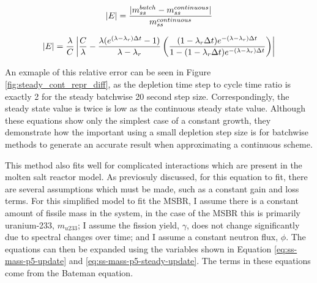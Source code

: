 \begin{equation} \hfill
|E| = \frac{|m_{ss}^{batch} - m_{ss}^{continuous}|}{m_{ss}^{continuous}}
\hfill\label{eq:ss-err-1} \end{equation}



\begin{equation} \hfill
|E| = \frac{\lambda}{C} \left| \frac{C}{\lambda}  - \frac{\lambda (e^{(\lambda - \lambda_r) \Delta t} - 1)}{\lambda - \lambda_r}  \left( \frac{(1 - \lambda_r \Delta t) e^{-(\lambda - \lambda_r) \Delta t}}{1 - (1 - \lambda_r \Delta t) e^{-(\lambda - \lambda_r) \Delta t}} \right) \right|
\hfill\label{eq:ss-err-4} \end{equation}

An exmaple of this relative error can be seen in Figure \ref{fig:steady_cont_repr_diff}, as the depletion time step to cycle time ratio is exactly 2 for the steady batchwise 20 second step size. Correspondingly, the steady state value is twice is low as the continuous steady state value. Although these equations show only the simplest case of a constant growth, they demonstrate how the important using a small depletion step size is for batchwise methods to generate an accurate result when approximating a continuous scheme.

This method also fits well for complicated interactions which are present in the molten salt reactor model.
As previosuly discussed, for this equation to fit, there are several assumptions which must be made, such as a constant gain and loss terms.
For this simplified model to fit the MSBR, I assume there is a constant amount of fissile mass in the system, in the case of the MSBR this is primarily uranium-233, $m_{u233}$; I assume the fission yield, $\gamma$, does not change significantly due to spectral changes over time; and
I assume a constant neutron flux, $\phi$.
The equations can then be expanded using the variables shown in Equation \eqref{eq:ss-mass-p5-update} and \eqref{eq:ss-mass-p5-steady-update}. The terms in these equations come from the Bateman equation.

